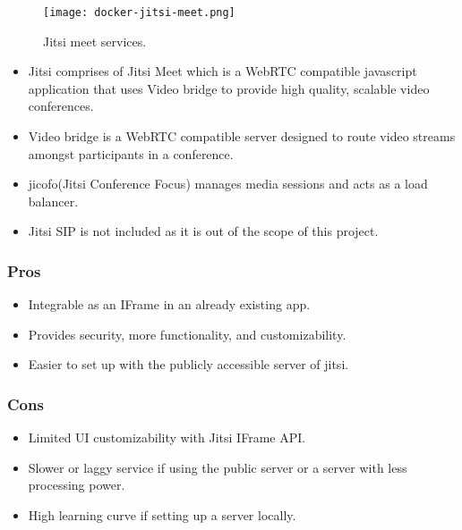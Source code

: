 \begin{figure}[h!]
    \begin{center}
        \texttt{[image: docker-jitsi-meet.png]}
    \end{center}
    \caption{Jitsi meet services.}
    \label{fig:jitsimeet}
\end{figure}

\begin{itemize}
    \item  Jitsi comprises of Jitsi Meet which is a WebRTC compatible javascript application that uses Video bridge to provide high quality, scalable video conferences.
    \item Video bridge is a WebRTC compatible server designed to route video streams amongst participants in a conference.
    \item jicofo(Jitsi Conference Focus) manages media sessions and acts as a load balancer.
    \item Jitsi SIP is not included as it is out of the scope of this project.
\end{itemize}

\subsubsection{Pros}

\begin{itemize}
    \item Integrable as an IFrame in an already existing app.
    \item Provides security, more functionality, and customizability.
    \item Easier to set up with the publicly accessible server of jitsi.
\end{itemize}

\subsubsection{Cons}

\begin{itemize}
    \item Limited UI customizability with Jitsi IFrame API.
    \item Slower or laggy service if using the public server or a server with less processing power.
    \item High learning curve if setting up a server locally.
\end{itemize}